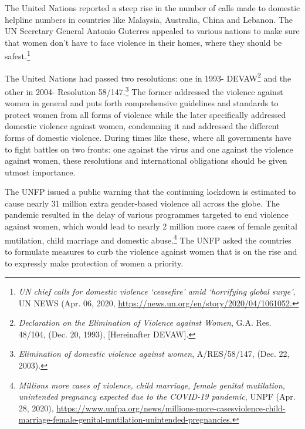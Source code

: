 \begin{multicols}{2}

\noi
The United Nations reported a steep rise in the number of calls made to domestic helpline
numbers in countries like Malaysia, Australia, China and Lebanon. The UN Secretary
General Antonio Guterres appealed to various nations to make sure that women don’t have to
face violence in their homes, where they should be safest.\footnote{\textit{UN chief calls for domestic violence ‘ceasefire’ amid ‘horrifying global surge’}, UN NEWS (Apr. 06, 2020,
\url{https://news.un.org/en/story/2020/04/1061052.}}

\noi
The United Nations had passed two resolutions: one in 1993- DEVAW\footnote{\textit{Declaration on the Elimination of Violence against Women}, G.A. Res. 48/104, (Dec. 20, 1993), [Hereinafter
DEVAW].} and the other in
2004- Resolution 58/147.\footnote{\textit{Elimination of domestic violence against women}, A/RES/58/147, (Dec. 22, 2003).} The former addressed the violence against women in general and
puts forth comprehensive guidelines and standards to protect women from all forms of
violence while the later specifically addressed domestic violence against women,
condemning it and addressed the different forms of domestic violence. During times like
these, where all governments have to fight battles on two fronts: one against the virus and one
against the violence against women, these resolutions and international obligations should be
given utmost importance.



\noi
The UNFP issued a public warning that the continuing lockdown is estimated to cause nearly
31 million extra gender-based violence all across the globe. The pandemic resulted in the
delay of various programmes targeted to end violence against women, which would lead to
nearly 2 million more cases of female genital mutilation, child marriage and domestic
abuse.\footnote{\textit{Millions more cases of violence, child marriage, female genital mutilation, unintended pregnancy expected
due to the COVID-19 pandemic}, UNPF (Apr. 28, 2020), \url{https://www.unfpa.org/news/millions-more-casesviolence-child-marriage-female-genital-mutilation-unintended-pregnancies.}} The UNFP asked the countries to formulate measures to curb the violence against
women that is on the rise and to expressly make protection of women a priority.



\end{multicols}
